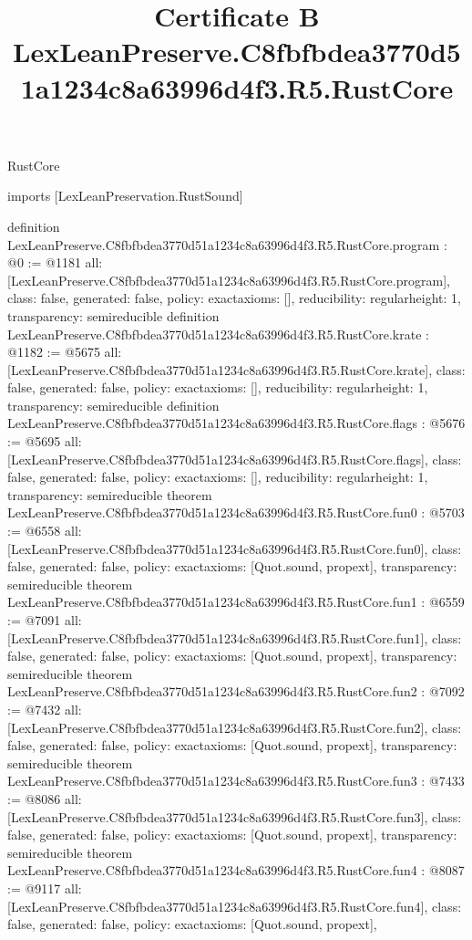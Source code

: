 \begin{lexlean}{RustCore}
\title{Certificate B LexLeanPreserve.C8fbfbdea3770d51a1234c8a63996d4f3.R5.RustCore}
\begin{coremodule}
imports [LexLeanPreservation.RustSound]

definition LexLeanPreserve.C8fbfbdea3770d51a1234c8a63996d4f3.R5.RustCore.program : @0 := @1181 {
  all: [LexLeanPreserve.C8fbfbdea3770d51a1234c8a63996d4f3.R5.RustCore.program],
  class: false,
  generated: false,
  policy: exact{axioms: []},
  reducibility: regular{height: 1},
  transparency: semireducible
}
definition LexLeanPreserve.C8fbfbdea3770d51a1234c8a63996d4f3.R5.RustCore.krate : @1182 := @5675 {
  all: [LexLeanPreserve.C8fbfbdea3770d51a1234c8a63996d4f3.R5.RustCore.krate],
  class: false,
  generated: false,
  policy: exact{axioms: []},
  reducibility: regular{height: 1},
  transparency: semireducible
}
definition LexLeanPreserve.C8fbfbdea3770d51a1234c8a63996d4f3.R5.RustCore.flags : @5676 := @5695 {
  all: [LexLeanPreserve.C8fbfbdea3770d51a1234c8a63996d4f3.R5.RustCore.flags],
  class: false,
  generated: false,
  policy: exact{axioms: []},
  reducibility: regular{height: 1},
  transparency: semireducible
}
theorem LexLeanPreserve.C8fbfbdea3770d51a1234c8a63996d4f3.R5.RustCore.fun0 : @5703 := @6558 {
  all: [LexLeanPreserve.C8fbfbdea3770d51a1234c8a63996d4f3.R5.RustCore.fun0],
  class: false,
  generated: false,
  policy: exact{axioms: [Quot.sound, propext]},
  transparency: semireducible
}
theorem LexLeanPreserve.C8fbfbdea3770d51a1234c8a63996d4f3.R5.RustCore.fun1 : @6559 := @7091 {
  all: [LexLeanPreserve.C8fbfbdea3770d51a1234c8a63996d4f3.R5.RustCore.fun1],
  class: false,
  generated: false,
  policy: exact{axioms: [Quot.sound, propext]},
  transparency: semireducible
}
theorem LexLeanPreserve.C8fbfbdea3770d51a1234c8a63996d4f3.R5.RustCore.fun2 : @7092 := @7432 {
  all: [LexLeanPreserve.C8fbfbdea3770d51a1234c8a63996d4f3.R5.RustCore.fun2],
  class: false,
  generated: false,
  policy: exact{axioms: [Quot.sound, propext]},
  transparency: semireducible
}
theorem LexLeanPreserve.C8fbfbdea3770d51a1234c8a63996d4f3.R5.RustCore.fun3 : @7433 := @8086 {
  all: [LexLeanPreserve.C8fbfbdea3770d51a1234c8a63996d4f3.R5.RustCore.fun3],
  class: false,
  generated: false,
  policy: exact{axioms: [Quot.sound, propext]},
  transparency: semireducible
}
theorem LexLeanPreserve.C8fbfbdea3770d51a1234c8a63996d4f3.R5.RustCore.fun4 : @8087 := @9117 {
  all: [LexLeanPreserve.C8fbfbdea3770d51a1234c8a63996d4f3.R5.RustCore.fun4],
  class: false,
  generated: false,
  policy: exact{axioms: [Quot.sound, propext]},
}
\end{coremodule}
\end{lexlean}

